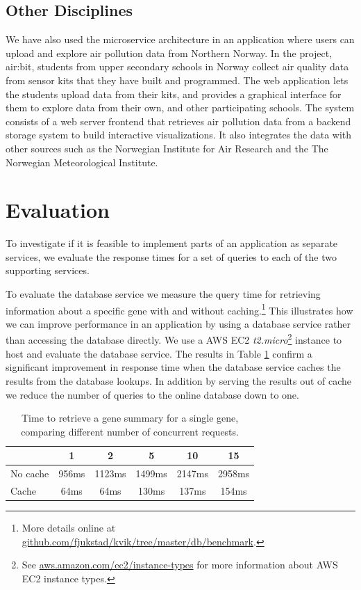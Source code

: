 \subsection{Other Disciplines}
We have also used the microservice architecture in an application where users
can upload and explore air pollution data from Northern
Norway.\cite{fjukstad2018low} In the project, air:bit, students from upper
secondary schools in Norway collect air quality data from sensor kits that they
have built and programmed. The web application lets the students upload data
from their kits, and provides a graphical interface for them to explore data
from their own, and other participating schools. The system consists of a web
server frontend that retrieves air pollution data from a backend storage system
to build interactive visualizations. It also integrates the data with other
sources such as the Norwegian Institute for Air Research and the The Norwegian
Meteorological Institute. 


\section{Evaluation} 

To investigate if it is feasible to implement parts of an application as
separate services, we evaluate the response times for a set of queries to each
of the two supporting services. 

To evaluate the database service we measure the query time for retrieving
information about a specific gene with and without caching.\footnote{More
details online at \url{github.com/fjukstad/kvik/tree/master/db/benchmark}.} This
illustrates how we can improve performance in an application by using a database
service rather than accessing the database directly. 
We use a AWS EC2 \emph{t2.micro}\footnote{See
\url{aws.amazon.com/ec2/instance-types} for more information about AWS EC2
instance types.} instance to host and evaluate the database service.  The
results in Table \ref{db} confirm a significant improvement in response time
when the database service caches the results from the database lookups. In
addition by serving the results out of cache we reduce the number of queries to
the online database down to one. 

\begin{table}[h]
    \caption[]{Time to retrieve a gene summary for a single gene, comparing
    different number of concurrent requests.}
    \begin{tabular}{| l | c | c | c | c | c | }
        \hline 
        & 1 & 2 & 5 & 10 & 15 \\ 
      \hline			
      No cache & 956ms & 1123ms & 1499ms & 2147ms & 2958ms\\
      \hline
      Cache & 64ms & 64ms & 130ms & 137ms & 154ms\\
      \hline  
    \end{tabular}
\label{db}
\end{table} 


